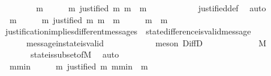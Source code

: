 \begin{isabellebody}
\ \ \ \ \isamarkupfalse%
\ \isamarkupfalse%
\ {\isachardoublequoteopen}{\isasymforall}\ m\ {\isasymin}\ {\isasymsigma}\ {\isacharminus}\ {\isasymsigma}{\isacharprime}{\isachardot}\ {\isasymexists}\ m{\isacharprime}{\isachardot}\ justified\ m{\isacharprime}\ m\ {\isasymand}\ m{\isacharprime}\ {\isasymin}\ {\isasymsigma}\ {\isacharminus}\ {\isasymsigma}{\isacharprime}{\isachardoublequoteclose}\isanewline
\ \ \ \ \ \ \isamarkupfalse%
\ justified{\isacharunderscore}def\ \isamarkupfalse%
\ auto\ \isanewline
\ \ \ \ \isamarkupfalse%
\ \isamarkupfalse%
\ {\isachardoublequoteopen}{\isasymforall}\ m\ {\isasymin}\ {\isasymsigma}\ {\isacharminus}\ {\isasymsigma}{\isacharprime}{\isachardot}\ {\isasymexists}\ m{\isacharprime}{\isachardot}\ justified\ m{\isacharprime}\ m\ {\isasymand}\ m{\isacharprime}\ {\isasymin}\ {\isasymsigma}\ {\isacharminus}\ {\isasymsigma}{\isacharprime}\ {\isasymand}\ m\ {\isasymnoteq}\ m{\isacharprime}{\isachardoublequoteclose}\ \isanewline
\ \ \ \ \ \ \isamarkupfalse%
\ justification{\isacharunderscore}implies{\isacharunderscore}different{\isacharunderscore}messages\ \ state{\isacharunderscore}difference{\isacharunderscore}is{\isacharunderscore}valid{\isacharunderscore}message\isanewline
\ \ \ \ \ \ message{\isacharunderscore}in{\isacharunderscore}state{\isacharunderscore}is{\isacharunderscore}valid\ \ {\isacartoucheopen}{\isasymsigma}{\isacharprime}\ {\isasymsubset}\ {\isasymsigma}{\isacartoucheclose}\isanewline
\ \ \ \ \ \ \isamarkupfalse%
\ {\isacharparenleft}meson\ DiffD{}\ {\isacartoucheopen}{\isasymsigma}\ {\isasymin}\ {\isasymSigma}{\isacartoucheclose}{\isacharparenright}\isanewline
\ \ \ \ \isamarkupfalse%
\ {\isachardoublequoteopen}{\isasymsigma}\ {\isacharminus}\ {\isasymsigma}{\isacharprime}\ {\isasymsubseteq}\ M{\isachardoublequoteclose}\isanewline
\ \ \ \ \ \ \isamarkupfalse%
\ {\isacartoucheopen}{\isasymsigma}\ {\isasymin}\ {\isasymSigma}{\isacartoucheclose}\ {\isacartoucheopen}{\isasymsigma}{\isacharprime}\ {\isasymsubset}\ {\isasymsigma}{\isacartoucheclose}\ state{\isacharunderscore}is{\isacharunderscore}subset{\isacharunderscore}of{\isacharunderscore}M\ \isamarkupfalse%
\ auto\isanewline
\ \ \ \ \isamarkupfalse%
\ \isamarkupfalse%
\ {\isachardoublequoteopen}{\isasymexists}\ m{\isacharunderscore}min\ {\isasymin}\ {\isasymsigma}\ {\isacharminus}\ {\isasymsigma}{\isacharprime}{\isachardot}\ {\isasymforall}\ m{\isachardot}\ justified\ m\ m{\isacharunderscore}min\ {\isasymlongrightarrow}\ m\ {\isasymnotin}\ {\isasymsigma}\ {\isacharminus}\ {\isasymsigma}{\isacharprime}{\isachardoublequoteclose}\isanewline

\end{isabellebody}
